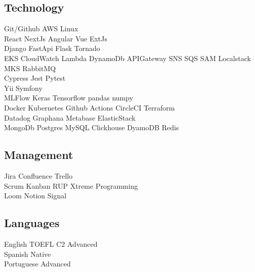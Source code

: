 \documentclass[]{deedy-resume-reversed}
\begin{document}
\begin{minipage}[t]{0.33\textwidth}
\subsection{\fontsize{10}{12}\selectfont Technology}
Git/Github \textbullet{} AWS \textbullet{} Linux \\
React \textbullet{} NextJs \textbullet{} Angular \textbullet{} Vue \textbullet{} ExtJs\\
Django \textbullet{} FastApi \textbullet{} Flask \textbullet{}  Tornado \\
EKS \textbullet{} CloudWatch \textbullet{} Lambda \textbullet{} DynamoDb \textbullet{} APIGateway \textbullet{} SNS  \textbullet{} SQS \textbullet{} SAM \textbullet{} Localstack \textbullet{} MKS \textbullet{} RabbitMQ\\
Cypress \textbullet{} Jest \textbullet{} Pytest\\
Yii \textbullet{} Symfony\\
MLFlow \textbullet{} Keras \textbullet{} Tensorflow \textbullet{} pandas \textbullet{} numpy\\
Docker \textbullet{} Kubernetes \textbullet{} Github Actions \textbullet{} CircleCI \textbullet{} Terraform\\
Datadog \textbullet{} Graphana \textbullet{} Metabase \textbullet{} ElasticStack\\
MongoDb \textbullet{} Postgres \textbullet{} MySQL \textbullet{} Clickhouse \textbullet{} DyamoDB \textbullet{} Redis\\
\sectionsep

\subsection{\fontsize{10}{12}\selectfont Management}
Jira \textbullet{} Confluence \textbullet{} Trello \\
Scrum \textbullet{} Kanban \textbullet{} RUP \textbullet{} Xtreme Programming \\
Loom \textbullet{} Notion \textbullet{} Signal\\
\sectionsep

\subsection{\fontsize{10}{12}\selectfont Languages}
English \textbullet{} TOEFL C2 \textbullet{} Advanced\\
Spanish \textbullet{} Native\\
Portuguese \textbullet{} Advanced\\
\sectionsep


\end{minipage}
\end{document}
